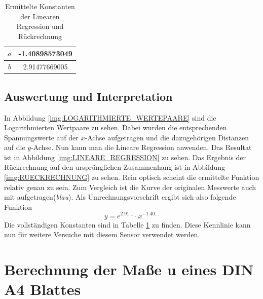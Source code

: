 \documentclass[12pt,oneside,a4paper]{report}
\begin{document}
\begin{table}[H]
\centering
\begin{tabular}{c|c}
 $a$ & -1.40898573049 \\ 
\hline $b$ & 2.91477669005 \\ 
\end{tabular} 
\caption{Ermittelte Konstanten der Linearen Regression und Rückrechnung}
\label{tab:KONSTANTEN_KENNLINIE}
\end{table}
\section{Auswertung und Interpretation}
\label{chap:VERSUCH_2_AUSWERTUNG}
In Abbildung \ref{img:LOGARITHMIERTE_WERTEPAARE} sind die Logarithmierten Wertpaare zu sehen. Dabei wurden die entsprechenden Spannungswerte auf der $x$-Achse aufgetragen und die dazugehörigen Distanzen auf die $y$-Achse.
Nun kann man die Lineare Regression anwenden. Das Resultat ist in Abbildung \ref{img:LINEARE_REGRESSION} zu sehen. Das Ergebnis der Rückrechnung auf den ursprünglichen Zusammenhang ist in Abbildung \ref{img:RUECKRECHNUNG} zu sehen. Rein optisch scheint die ermittelte Funktion relativ genau zu sein. Zum Vergleich ist die Kurve der originalen Messwerte auch mit aufgetragen(\textit{blau}). Als Umrechnungsvorschrift ergibt sich also folgende Funktion
\begin{equation}
y = e^{2.91...} \cdot x^{-1.40...}
\end{equation}
Die vollständigen Konstanten sind in Tabelle \ref{tab:KONSTANTEN_KENNLINIE} zu finden.
Diese Kennlinie kann nun für weitere Versuche mit diesem Sensor verwendet werden.

%
%
\chapter{Berechnung der Maße u eines DIN A4 Blattes}
\label{chap:VERSUCH_3}
\end{document}
